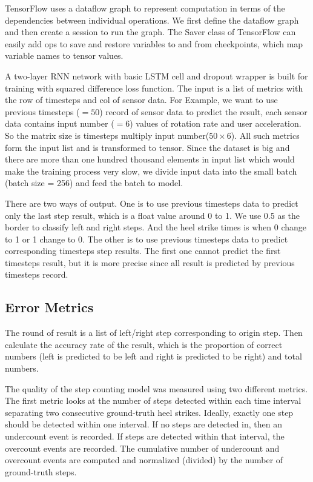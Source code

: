 \documentclass[11pt]{article}
\begin{document}
TensorFlow uses a dataflow graph to represent computation in terms of the dependencies between individual operations. We first define the dataflow graph and then create a session to run the graph. The Saver class of TensorFlow can easily add ops to save and restore variables to and from checkpoints, which map variable names to tensor values.

A two-layer RNN network with basic LSTM cell and dropout wrapper is built for training with squared difference loss function. The input is a list of metrics with the row of timesteps and col of sensor data. For Example, we want to use previous timesteps ($=50$) record of sensor data to predict the result, each sensor data contains input number ($=6$) values of rotation rate and user acceleration. So the matrix size is timesteps multiply input number($50 \times 6$). All such metrics form the input list and is transformed to tensor. Since the dataset is big and there are more than one hundred thousand elements in input list which would make the training process very slow, we divide input data into the small batch (batch size = 256) and feed the batch to model.

There are two ways of output. One is to use previous timesteps data to predict only the last step result, which is a float value around 0 to 1. We use 0.5 as the border to classify left and right steps. And the heel strike times is when 0 change to 1 or 1 change to 0. The other is to use previous timesteps data to predict corresponding timesteps step results. The first one cannot predict the first timesteps result, but it is more precise since all result is predicted by previous timesteps record.

\subsection{Error Metrics}
The round of result is a list of left/right step corresponding to origin step. Then calculate the accuracy rate of the result, which is the proportion of correct numbers (left is predicted to be left and right is predicted to be right) and total numbers.

The quality of the step counting model was measured using two different metrics. The first metric looks at the number of steps detected within each time interval separating two consecutive ground-truth heel strikes. Ideally, exactly one step should be detected within one interval. If no steps are detected in, then an undercount event is recorded. If steps are detected within that interval, the overcount events are recorded. The cumulative number of undercount and overcount events are computed and normalized (divided) by the number of ground-truth steps.
\end{document}
